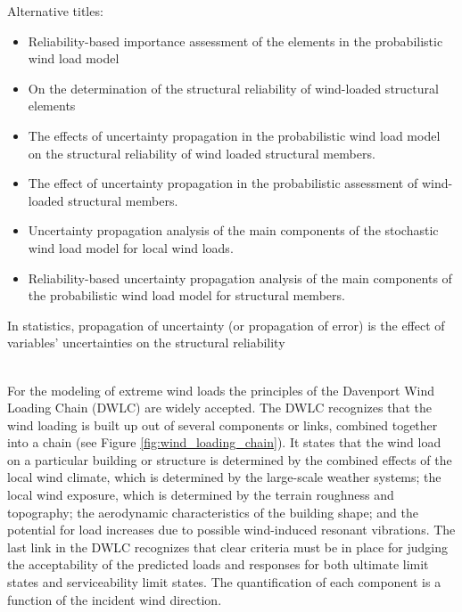\begin{framed}
Alternative titles: 
\begin{itemize}
\item Reliability-based importance assessment of the elements in the probabilistic wind load model 
\item On the determination of the structural reliability of wind-loaded structural elements
\item The effects of uncertainty propagation in the probabilistic wind load model on the structural reliability of wind loaded structural members. 
\item The effect of uncertainty propagation in the probabilistic assessment of wind-loaded structural members. 
\item Uncertainty propagation analysis of the main components of the stochastic wind load model for local wind loads.
\item Reliability-based uncertainty propagation analysis of the main components of the probabilistic wind load model for structural members. 
\end{itemize}
In statistics, propagation of uncertainty (or propagation of error) is the effect of variables' uncertainties on the structural reliability
\end{framed}


\begin{framed}
\\
For the modeling of extreme wind loads the principles of the Davenport Wind Loading Chain (DWLC) are widely accepted\cite{Davenport_2002}. The DWLC recognizes that the wind loading is built up out of several components or links,  combined together into a chain (see Figure \ref{fig:wind_loading_chain}). It states that the wind load  
on a particular building or structure is determined by the combined effects of the local wind climate, which is determined by the large-scale weather systems; the local wind exposure, which is determined by the terrain roughness and topography; the aerodynamic characteristics of the building shape; and the potential for load increases due to possible wind-induced resonant vibrations. The last link in the DWLC recognizes that clear criteria must be in place for judging the acceptability of the predicted loads and responses for both ultimate limit states and serviceability limit states. 
The quantification of each component is a function of the incident wind direction.
\end{framed}


